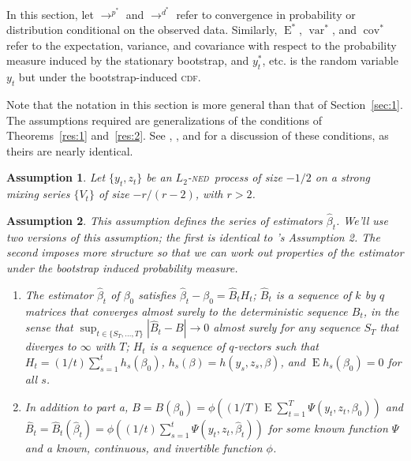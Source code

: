 \documentclass[12pt]{article}
\newcommand\citepos[2][]{\citeauthor{#2}'s \citeyearpar[#1]{#2}}
\newtheorem{asmp}{Assumption}[section]
\theoremstyle{definition}
\DeclareMathOperator{\E}{E}
\DeclareMathOperator{\var}{var}
\DeclareMathOperator{\cov}{cov}
\newcommand{\ned}{\textsc{ned}}
\newcommand{\cdf}{\textsc{cdf}}
\begin{document}
In this section, let $\to^{p^{*}}$ and $\to^{d^{*}}$ refer to
convergence in probability or distribution conditional on the observed
data.  Similarly, $\E^{*}$, $\var^{*}$, and $\cov^{*}$ refer to the
expectation, variance, and covariance with respect to the probability
measure induced by the stationary bootstrap, and $y_t^{*}$, etc. is
the random variable $y_t$ but under the bootstrap-induced \cdf.

Note that the notation in this section is more general than that of
Section~\ref{sec:1}.  The assumptions required are generalizations of
the conditions of Theorems~\ref{res:1} and~\ref{res:2}.  See
\citet{Wes:96,Wes:06}, \citet{WeM:98}, and \citet{Mcc:00} for a
discussion of these conditions, as theirs are nearly identical.

\begin{asmp}\label{asmp:a1} 
  Let $\{y_t, z_t\}$ be an $L_2$-\ned\ process of size $-1/2$ on a
  strong mixing series $\{V_t\}$ of size $-r/(r-2)$, with $r > 2$.
\end{asmp}

\begin{asmp}\label{asmp:a2}  This assumption defines the series of
  estimators $\hat{\beta}_t$.  We'll use two versions of this
  assumption; the first is identical to \citepos{Wes:96} Assumption 2.
  The second imposes more structure so that we can work out properties
  of the estimator under the bootstrap induced probability measure.
  \begin{enumerate}
  \item[a.] The estimator $\hat{\beta}_t$ of $\beta_0$ satisfies
    $\hat{\beta}_{t} - \beta_{0} = \hat{B}_{t} H_t$;
    $\hat{B}_{t}$ is a sequence of $k$ by $q$ matrices that converges
    almost surely to the deterministic sequence $B_{t}$, in the sense
    that $\sup_{t \in \{S_T,\dots,T\}} | \hat{B}_{t} - B | \to 0$
    almost surely for any sequence $S_T$ that diverges to $\infty$
    with $T$; $H_{t}$ is a sequence of $q$-vectors such that $H_{t}
    = (1/t) \sum_{s=1}^t h_{s}(\beta_{0})$, $h_{s}(\beta) =
    h(y_{s}, z_{s}, \beta)$, and $\E h_{s}(\beta_{0}) = 0$ for all
    $s$.
  \item[b.] In addition to part a, $B = B(\beta_{0}) =
    \phi((1/T) \E \sum_{t=1}^T \Psi(y_{t}, z_{t},
    \beta_{0}))$ and $\hat{B}_{t} =
    \hat{B}_{t}(\hat{\beta}_{t}) = \phi((1/t) \sum_{s=1}^t \Psi(y_{t},
    z_{t}, \hat{\beta}_{t}))$ for some known function $\Psi$ and
    a known, continuous, and invertible function $\phi$.
  \end{enumerate}
\end{asmp}
\end{document}
